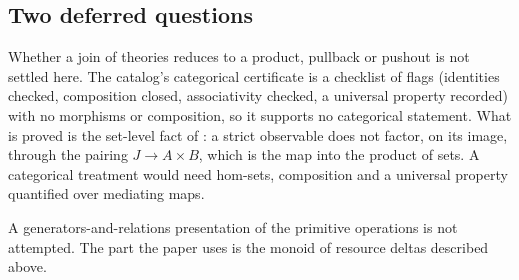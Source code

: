 \subsection{Two deferred questions}

\begin{remark}
\label{rem:deferral-categorical}
Whether a join of theories reduces to a product, pullback or pushout
\citep{MacLane1998} is not settled here. The catalog's categorical certificate is a
checklist of flags (identities checked, composition closed, associativity checked, a
universal property recorded) with no morphisms or composition, so it supports no
categorical statement. What is proved is the set-level fact of : a
strict observable does not factor, on its image, through the pairing $J\to A\times B$, which is the map
into the product of sets. A categorical treatment would need hom-sets, composition and a
universal property quantified over mediating maps.
\end{remark}

\begin{remark}
\label{rem:deferral-algebra}
A generators-and-relations presentation of the primitive operations is not attempted. The
part the paper uses is the monoid of resource deltas described above.
\end{remark}
